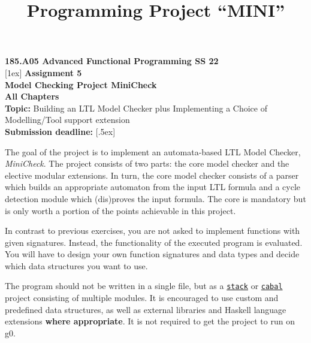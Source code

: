 \documentclass{article}
\title{Programming Project ``MINI''}
\begin{document}
\large
\thispagestyle{empty}
\begin{center}
  {\Large \textbf{185.A05 Advanced Functional Programming SS 22}}  \\ [1ex] 
              [1ex] 
               {\Large \textbf{Assignment 5}} \\[.5ex]
              {\Large \textbf{Model Checking Project MiniCheck}} \\[.5ex]
                 \textbf{All Chapters}  \\ [.75ex]
           \textbf{Topic:} Building an LTL Model Checker plus Implementing a Choice of Modelling/Tool support extension  \\[1ex]
          \textbf{Submission deadline:}   [.5ex]
\end{center}

\vspace{1ex}
\noindent
\noindent





\newcommand{\code}[1]{\texttt{#1}}

\noindent
The goal of the project is to implement an automata-based LTL Model Checker, \textit{MiniCheck}. The project consists of two parts: 
the core model checker and the elective modular extensions. In turn, the core model checker consists of a parser which builds 
an appropriate automaton from the input LTL formula and a cycle detection module which (dis)proves the input formula.
The core is mandatory but is only worth a portion of the points achievable in this project.

In contrast to previous exercises, you are not asked to implement functions with given signatures. 
Instead, the functionality of the executed program is evaluated. 
You will have to design your own function signatures and data types and decide which data structures you want to use.

The program should not be written in a single file, but as a \href{https://docs.haskellstack.org/en/stable/README/}{\code{stack}} 
or \href{https://cabal.readthedocs.io/en/3.4/}{\code{cabal}} project consisting of multiple modules. 
It is encouraged to use custom and predefined data structures, as well as external libraries 
and Haskell language extensions \textbf{where appropriate}. It is not required to get the project to run on g0.
\end{document}
